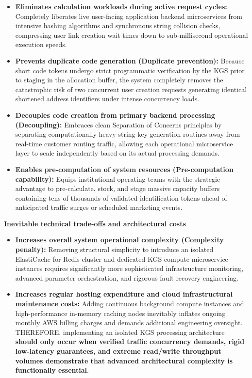 \begin{itemize}
\tightlist
\item
  \textbf{Eliminates calculation workloads during active request
  cycles:} Completely liberates live user-facing application backend
  microservices from intensive hashing algorithms and synchronous string
  collision checks, compressing user link creation wait times down to
  sub-millisecond operational execution speeds.
\item
  \textbf{Prevents duplicate code generation (Duplicate prevention):}
  Because short code tokens undergo strict programmatic verification by
  the KGS prior to staging in the allocation buffer, the system
  completely removes the catastrophic risk of two concurrent user
  creation requests generating identical shortened address identifiers
  under intense concurrency loads.
\item
  \textbf{Decouples code creation from primary backend processing
  (Decoupling):} Embraces clean Separation of Concerns principles by
  separating computationally heavy string key generation routines away
  from real-time customer routing traffic, allowing each operational
  microservice layer to scale independently based on its actual
  processing demands.
\item
  \textbf{Enables pre-computation of system resources (Pre-computation
  capability):} Equips institutional operating teams with the strategic
  advantage to pre-calculate, stock, and stage massive capacity buffers
  containing tens of thousands of validated identification tokens ahead
  of anticipated traffic surges or scheduled marketing events.
\end{itemize}

\vspace{0.5em}\noindent\textbf{Inevitable technical trade-offs and architectural
costs}\par

\begin{itemize}
\tightlist
\item
  \textbf{Increases overall system operational complexity (Complexity
  penalty):} Removing structural simplicity to introduce an isolated
  ElastiCache for Redis cluster and dedicated KGS compute microservice
  instances requires significantly more sophisticated infrastructure
  monitoring, advanced parameter orchestration, and rigorous fault
  recovery engineering.
\item
  \textbf{Increases regular hosting expenditure and cloud
  infrastructural maintenance costs:} Adding continuous background
  compute instances and high-performance in-memory caching nodes
  inevitably inflates ongoing monthly AWS billing charges and demands
  additional engineering oversight. THEREFORE, implementing an isolated
  KGS processing architecture \textbf{should only occur when verified
  traffic concurrency demands, rigid low-latency guarantees, and extreme
  read/write throughput volumes demonstrate that advanced architectural
  complexity is functionally essential}.
\end{itemize}

